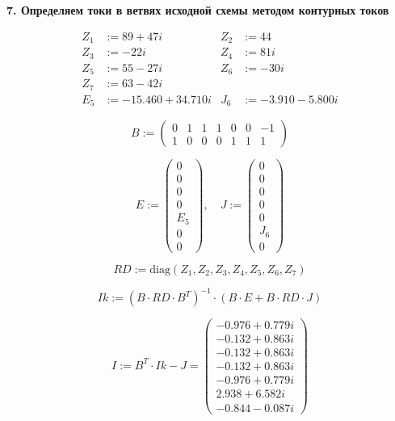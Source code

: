\documentclass{article}
\begin{document}
\textbf{7. Определяем токи в ветвях исходной схемы методом контурных токов}

\begin{align*}
Z_1 &:= 89 + 47i & Z_2 &:= 44 \\
Z_3 &:= -22i & Z_4 &:= 81i \\
Z_5 &:= 55 - 27i & Z_6 &:= -30i \\
Z_7 &:= 63 - 42i \\
E_5 &:= -15.460 + 34.710i & J_6 &:= -3.910 - 5.800i
\end{align*}

\[
B := \begin{pmatrix} 
0 & 1 & 1 & 1 & 0 & 0 & -1 \\ 
1 & 0 & 0 & 0 & 1 & 1 & 1 
\end{pmatrix}
\]

\[
E := \begin{pmatrix} 0 \\ 0 \\ 0 \\ 0 \\ E_5 \\ 0 \\ 0 \end{pmatrix}, \quad 
J := \begin{pmatrix} 0 \\ 0 \\ 0 \\ 0 \\ 0 \\ J_6 \\ 0 \end{pmatrix}
\]

\[
RD := \text{diag}(Z_1, Z_2, Z_3, Z_4, Z_5, Z_6, Z_7)
\]

\[
Ik := (B \cdot RD \cdot B^T)^{-1} \cdot (B \cdot E + B \cdot RD \cdot J)
\]

\[
I := B^T \cdot Ik - J = \begin{pmatrix} 
-0.976 + 0.779i \\ 
-0.132 + 0.863i \\ 
-0.132 + 0.863i \\ 
-0.132 + 0.863i \\ 
-0.976 + 0.779i \\ 
2.938 + 6.582i \\ 
-0.844 - 0.087i 
\end{pmatrix}
\]
\end{document}
